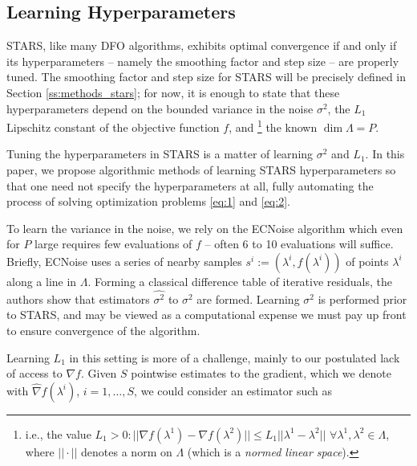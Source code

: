\documentclass{amsart}
\begin{document}
\subsection{Learning Hyperparameters}  \label{ss:hyper_learn}
STARS, like many DFO algorithms, exhibits optimal convergence if and only if its hyperparameters -- namely the smoothing factor and step size -- are properly tuned. The smoothing factor and step size for STARS will be precisely defined in  Section \ref{ss:methods_stars}; for now, it is enough to state that these hyperparameters depend on the bounded variance in the noise $\sigma^2$,  the $L_1$ Lipschitz constant of the objective function $f$, and 
\footnote{i.e., the value $L_1> 0: ||\nabla f(\lambda^1)-\nabla f(\lambda^2)|| \leq L_1 ||\lambda^1 -\lambda^2||$ $\forall \lambda^1, \lambda^2 \in \Lambda$, where $||\cdot||$ denotes a norm on $\Lambda$ (which is a \textit{normed linear space}).}
the known $\dim \Lambda=P$. %

Tuning the hyperparameters in STARS is a matter of learning $\sigma^2$ and $L_1$. In this paper, we propose algorithmic methods of learning STARS hyperparameters so that one need not specify the hyperparameters at all, fully automating the process of solving optimization problems \eqref{eq:1} and \eqref{eq:2}. 

To learn the variance in the noise, we rely on the ECNoise algorithm \cite{MW} which even for $P$ large requires few evaluations of $f$ -- often 6 to 10 evaluations will suffice. Briefly, ECNoise uses a series of nearby samples $s^i:=(\lambda^i,f(\lambda^i))$ of points $\lambda^i$ along a line in $\Lambda$. Forming a classical difference table of iterative residuals, the authors show that estimators $\hat{\sigma^2}$ to $\sigma^2$ are formed. Learning $\sigma^2$ is performed prior to STARS, and may be viewed as a computational expense we must pay up front to ensure convergence of the algorithm.

Learning $L_1$ in this setting is more of a challenge, mainly to our postulated %
lack of access to $\nabla f$. Given $S$ pointwise estimates to the gradient, which we denote with $\hat{\nabla}f(\lambda^i)$, $i=1,\ldots, S$, we could consider an estimator such as
\end{document}
